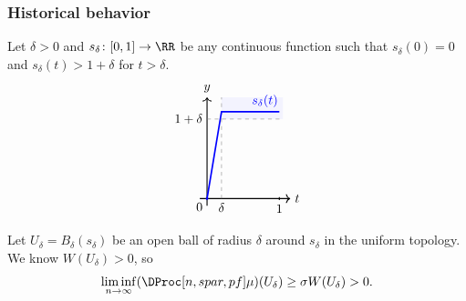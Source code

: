 \documentclass[shortlabels, 9pt, aspectratio=2013]{beamer}
\begin{document}
\begin{frame}[fragile]
  \frametitle{Historical behavior}
  \begin{proofs}
    Let \(\delta > 0\) and \(s_{\delta} \colon [0,1] \to \RR\) be any continuous function such that \(s_{\delta}(0) = 0\) and \(s_{\delta}(t) > 1 + \delta\) for \(t > \delta\).
    \[
      \begin{tikzpicture}[scale=2]
        
        \def\del{0.2}
        \def\oneplusdel{1.1}
        \def\sval{1.2} %

        \fill[blue!15,opacity=0.3] (\del, \oneplusdel) rectangle (1.05, 1.4);

        \draw[->, thick] (-0.1, 0) -- (1.15, 0) node[right] {$t$};
        \draw[->, thick] (0, -0.1) -- (0, 1.4) node[above] {$y$};
        
        \draw[dashed, gray] (\del, 0) node[below, text=black] {$\delta$} -- (\del, 1.4);
        \draw[dashed, gray] (0, \oneplusdel) node[left, text=black] {$1+\delta$} -- (1.05, \oneplusdel);
        \draw[thick] (1, 0.02) -- (1, -0.02) node[below] {$1$};
        
        \draw[very thick, blue] (0,0) -- (\del, \sval) -- (1, \sval);
        
        \node[blue, above] at (0.8, \sval) {$s_\delta(t)$};
        
        \fill[blue] (0,0) circle (0.5pt) node[below left, text=black] {$0$};

      \end{tikzpicture}
    \]
    Let \(U_{\delta} = B_{\delta}(s_{\delta})\) be an open ball of radius \(\delta\) around \(s_{\delta}\) in the uniform topology. We know \(W(U_{\delta}) > 0\), so
    \begin{equation*}
      \liminf_{n \to \infty}(\DProc[n,spar,pf]\mu)(U_{\delta}) \geq \sigma W(U_{\delta}) > 0.
    \end{equation*}
  \end{proofs}
\end{frame}
\end{document}
